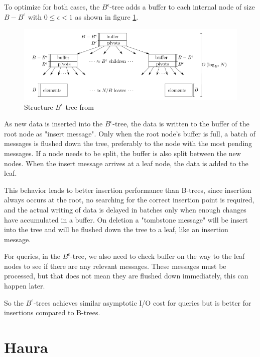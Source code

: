 \documentclass[
	12pt,
	a4paper,
	abstract,
	bibliography=totoc,
	chapterprefix,
	headings=openright,
	numbers=endperiod,
	parskip=half,
	twoside,
]{scrreprt}
\begin{document}
To optimize for both cases, the $B^{\epsilon}$-tree adds a buffer to each internal node of size $B - B^{\epsilon} $ with $ 0 \leq \epsilon < 1$ as shown in figure \ref{fig:structure B-epsilon-tree}.

\begin{figure}[ht]
	\centering
	\includegraphics[scale=0.6]{B-epsilon_structure.png}
	\caption{Structure $B^{\epsilon}$-tree from \cite{bender2015introduction}}
		\label{fig:structure B-epsilon-tree}
\end{figure}

As new data is inserted into the $B^{\epsilon}$-tree, the data is written to the buffer of the root node as "insert message".
Only when the root node's buffer is full, a batch of messages is flushed down the tree, preferably to the node with the most pending messages. 
If a node needs to be split, the buffer is also split between the new nodes.
When the insert message arrives at a leaf node, the data is added to the leaf.

This behavior leads to better insertion performance than B-trees, since insertion always occurs at the root, no searching for the correct insertion point is required, and  
the actual writing of data is delayed in batches only when enough changes have accumulated in a buffer.
On deletion a "tombstone message" will be insert into the tree and will be flushed down the tree to a leaf, like an insertion message.

For queries, in the $B^{\epsilon}$-tree, we also need to check buffer on the way to the leaf nodes to see if there are any relevant messages.
These messages must be processed, but that does not mean they are flushed down immediately, this can happen later.

So the $B^{\epsilon}$-trees achieves similar asymptotic I/O cost for queries but is better for insertions compared to B-trees.


\section{Haura}
\end{document}
